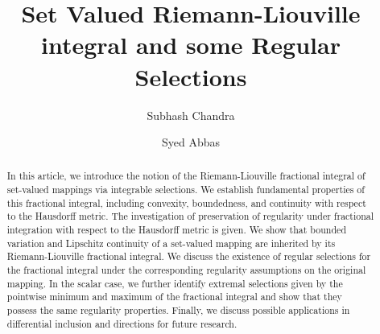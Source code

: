 \documentclass[a4paper,12pt,reqno]{amsart}
\numberwithin{equation}{section}
\theoremstyle{definition}
\theoremstyle{remark}
\numberwithin{equation}{section}
\begin{document}
	
	\title[Set Valued Riemann-Liouville integral and some Regular Selections]{Set Valued Riemann-Liouville integral and some Regular Selections}
	
	
	
	
	
	
		\author{Subhash Chandra}
	\address{Harish-Chandra Research Institute, A CI of Homi Bhabha National Institute, Prayagraj, India}
	
	\author{Syed Abbas}
\address{School of Mathematical and Statistical Sciences, Indian Institute of Technology Mandi\\ Kamand (H.P.)- 175005, India}
	
	
	
	

	
	
	\begin{abstract}
In this article, we introduce the notion of the Riemann-Liouville fractional integral of set-valued mappings via integrable selections. We establish fundamental properties of this fractional integral, including convexity, boundedness, and continuity with respect to the Hausdorff metric. The investigation of preservation of regularity under fractional integration with respect to the Hausdorff metric is given. We show that bounded variation and Lipschitz continuity of a set-valued mapping are inherited by its Riemann-Liouville fractional integral.  We discuss the existence of regular selections for the fractional integral under the corresponding regularity assumptions on the original mapping. In the scalar case, we further identify extremal selections given by the pointwise minimum and maximum of the fractional integral and show that they possess the same regularity properties. Finally, we discuss possible applications in differential inclusion and directions for future research.
    

	\end{abstract}
	\maketitle
	
\end{document}
